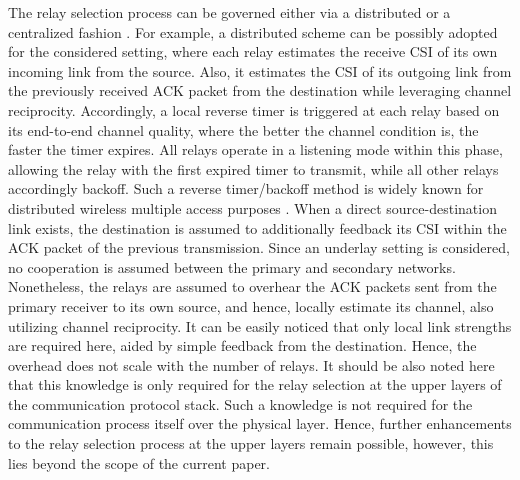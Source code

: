 \documentclass[10pt,journal]{IEEEtran}
\begin{document}
The relay selection process can be governed either via a distributed \cite{200603_JSAC_Bletsas_Relay_selection} or a centralized fashion \cite{200810_TWC_Michlopoulos_Relay_Selection}. For example, a distributed scheme can be possibly adopted for the considered setting, where each relay estimates the receive \ac{CSI} of its own incoming link from the source. Also, it estimates the \ac{CSI} of its outgoing link from the previously received \ac{ACK} packet from the destination while leveraging channel reciprocity. Accordingly, a local reverse timer is triggered at each relay based on its end-to-end channel quality, where the better the channel condition is, the faster the timer expires. All relays operate in a listening mode within this phase, allowing the relay with the first expired timer to transmit, while all other relays accordingly backoff. Such a reverse timer/backoff method is widely known for distributed wireless multiple access purposes \cite{200603_JSAC_Bletsas_Relay_selection}. When a direct source-destination link exists, the destination is assumed to additionally feedback its \ac{CSI} within the \ac{ACK} packet of the previous transmission. Since an underlay setting is considered, no cooperation is assumed between the primary and secondary networks. Nonetheless, the relays are assumed to overhear the \ac{ACK} packets sent from the primary receiver to its own source, and hence, locally estimate its channel, also utilizing channel reciprocity. It can be easily noticed that only local link strengths are required here, aided by simple feedback from the destination. Hence, the overhead does not scale with the number of relays. It should be also noted here that this knowledge is only required for the relay selection at the upper layers of the communication protocol stack. Such a knowledge is not required for the communication process itself over the physical layer. Hence,  further enhancements to the relay selection process at the upper layers remain possible, however, this lies beyond the scope of the current paper.
%
\end{document}
